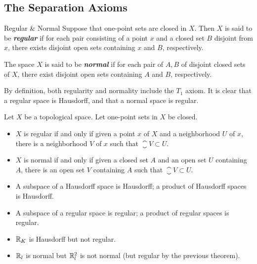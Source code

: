 \documentclass[12pt,a4paper]{article}
\begin{document}
    \subsection{The Separation Axioms}
    \begin{defi}{Regular \& Normal}
        Suppose that one-point sets are closed in $X$. Then $X$ is said to be \textbf{\textit{regular}} if for each pair consisting of a point $x$ and a closed set $B$ disjoint from $x$, there exists disjoint open sets containing $x$ and $B$, respectively.

        The space $X$ is said to be \textbf{\textit{normal}} if for each pair of $A,B$ of disjoint closed sets of $X$, there exist disjoint open sets containing $A$ and $B$, respectively.
    \end{defi}
    \begin{remark}
        By definition, both regularity and normality include the $T_1$ axiom. It is clear that a regular space is Hausdorff, and that a normal space is regular.
    \end{remark}
    \hfill

    \begin{lemma}\label{4.2.2}
        Let $X$ be a topological space. Let one-point sets in $X$ be closed.
        \begin{itemize}
            \item $X$ is regular if and only if given a point $x$ of $X$ and a neighborhood $U$ of $x$, there is a neighborhood $V$ of $x$ such that $\closure{V}\subset U$.
            \item $X$ is normal if and only if given a closed set $A$ and an open set $U$ containing $A$, there is an open set $V$ containing $A$ such that $\closure{V}\subset U$.
        \end{itemize}
    \end{lemma}
    \hfill

    \begin{thm}\hfill
    
        \begin{itemize}
            \item A subspace of a Hausdorff space is Hausdorff; a product of Hausdorff spaces is Hausdorff.
            \item A subspace of a regular space is regular; a product of regular spaces is regular.
        \end{itemize}
    \end{thm}
    \hfill

    \begin{eg}\hfill
    
        \begin{itemize}
            \item $\mathbb{R}_K$ is Hausdorff but not regular.
            \item $\mathbb{R}_l$ is normal but $\mathbb{R}^2_l$ is not normal (but regular by the previous theorem).
        \end{itemize}
    \end{eg}
    \hfill
\end{document}
